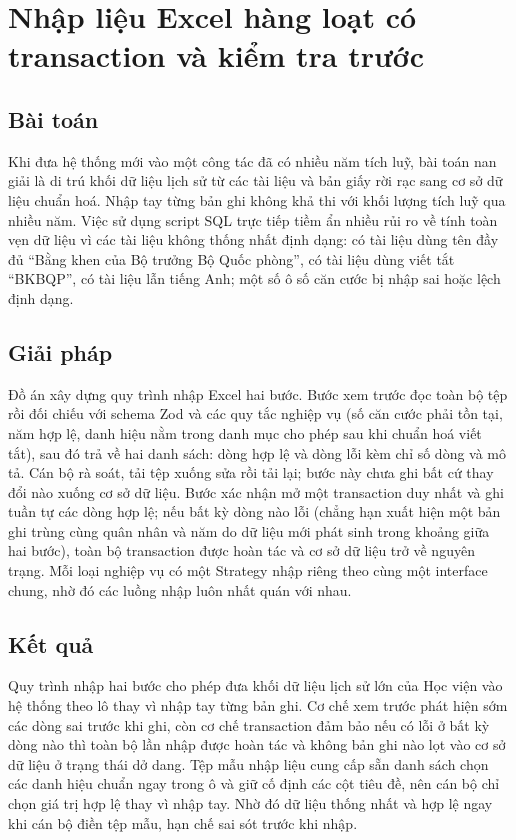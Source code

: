 \documentclass[../DoAn.tex]{subfiles}
\begin{document}
\section{Nhập liệu Excel hàng loạt có transaction và kiểm tra trước}
\label{section:5.4}

\subsection{Bài toán}
Khi đưa hệ thống mới vào một công tác đã có nhiều năm tích luỹ, bài toán nan giải là di trú khối dữ liệu lịch sử từ các tài liệu và bản giấy rời rạc sang cơ sở dữ liệu chuẩn hoá.
Nhập tay từng bản ghi không khả thi với khối lượng tích luỹ qua nhiều năm.
Việc sử dụng script SQL trực tiếp tiềm ẩn nhiều rủi ro về tính toàn vẹn dữ liệu vì các tài liệu không thống nhất định dạng: có tài liệu dùng tên đầy đủ ``Bằng khen của Bộ trưởng Bộ Quốc phòng'', có tài liệu dùng viết tắt ``BKBQP'', có tài liệu lẫn tiếng Anh; một số ô số căn cước bị nhập sai hoặc lệch định dạng.

\subsection{Giải pháp}
Đồ án xây dựng quy trình nhập Excel hai bước.
Bước xem trước đọc toàn bộ tệp rồi đối chiếu với schema Zod và các quy tắc nghiệp vụ (số căn cước phải tồn tại, năm hợp lệ, danh hiệu nằm trong danh mục cho phép sau khi chuẩn hoá viết tắt), sau đó trả về hai danh sách: dòng hợp lệ và dòng lỗi kèm chỉ số dòng và mô tả.
Cán bộ rà soát, tải tệp xuống sửa rồi tải lại; bước này chưa ghi bất cứ thay đổi nào xuống cơ sở dữ liệu.
Bước xác nhận mở một transaction duy nhất và ghi tuần tự các dòng hợp lệ; nếu bất kỳ dòng nào lỗi (chẳng hạn xuất hiện một bản ghi trùng cùng quân nhân và năm do dữ liệu mới phát sinh trong khoảng giữa hai bước), toàn bộ transaction được hoàn tác và cơ sở dữ liệu trở về nguyên trạng.
Mỗi loại nghiệp vụ có một Strategy nhập riêng theo cùng một interface chung, nhờ đó các luồng nhập luôn nhất quán với nhau.

\subsection{Kết quả}
Quy trình nhập hai bước cho phép đưa khối dữ liệu lịch sử lớn của Học viện vào hệ thống theo lô thay vì nhập tay từng bản ghi.
Cơ chế xem trước phát hiện sớm các dòng sai trước khi ghi, còn cơ chế transaction đảm bảo nếu có lỗi ở bất kỳ dòng nào thì toàn bộ lần nhập được hoàn tác và không bản ghi nào lọt vào cơ sở dữ liệu ở trạng thái dở dang.
Tệp mẫu nhập liệu cung cấp sẵn danh sách chọn các danh hiệu chuẩn ngay trong ô và giữ cố định các cột tiêu đề, nên cán bộ chỉ chọn giá trị hợp lệ thay vì nhập tay. Nhờ đó dữ liệu thống nhất và hợp lệ ngay khi cán bộ điền tệp mẫu, hạn chế sai sót trước khi nhập.
\end{document}
